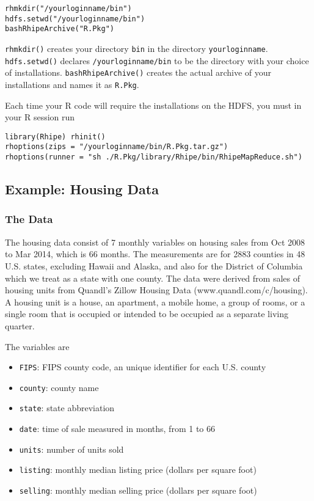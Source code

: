\begin{verbatim}
rhmkdir("/yourloginname/bin")
hdfs.setwd("/yourloginname/bin")
bashRhipeArchive("R.Pkg")
\end{verbatim}

\texttt{rhmkdir()} creates your directory \texttt{bin} in the directory \texttt{yourloginname}.
\texttt{hdfs.setwd()} declares \texttt{/yourloginname/bin} to be the directory with your
choice of installations.  \texttt{bashRhipeArchive()} creates the actual archive of
your installations and names it as \texttt{R.Pkg}.

Each time your R code will require the installations on the HDFS, you
must in your R session run

\begin{verbatim}
library(Rhipe) rhinit()
rhoptions(zips = "/yourloginname/bin/R.Pkg.tar.gz")
rhoptions(runner = "sh ./R.Pkg/library/Rhipe/bin/RhipeMapReduce.sh")
\end{verbatim}


\subsection{Example: Housing Data}
\subsubsection{The Data}

The housing data consist of 7 monthly variables on housing sales from Oct
2008 to Mar 2014, which is 66 months. The measurements are for 2883 counties
in 48 U.S. states, excluding Hawaii and Alaska, and also for the District of
Columbia which we treat as a state with one county.
The data were derived from sales of housing units from Quandl's Zillow Housing
Data (www.quandl.com/c/housing).
A housing unit is a house, an apartment, a mobile home, a group of rooms, or a
single room that is occupied or intended to be occupied  as a
separate living quarter.

The variables are
\begin{itemize}
\item \verb|FIPS|: FIPS county code, an unique identifier for each U.S. county
\item \verb|county|: county name
\item \verb|state|: state abbreviation
\item \verb|date|: time of sale measured in months, from 1 to 66
\item \verb|units|: number of units sold
\item \verb|listing|: monthly median listing price (dollars per square foot)
\item \verb|selling|: monthly median selling price (dollars per square foot)
\end{itemize}

